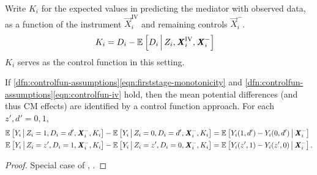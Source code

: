 Write $K_i$ for the expected values in predicting the mediator with observed data, as a function of the instrument $\vec X_i^{\text{IV}}$ and remaining controls $\vec X_i^-$.
\begin{align*}
    K_i &= D_i - \mathbb{E}_{} \left[ D_i \, \middle\vert \, Z_i, \boldsymbol{\mathit{X}}_i^{\text{IV}}, \boldsymbol{\mathit{X}}_i^- \right]
\end{align*}
$K_{i}$ serves as the control function in this setting.
\begin{theorem}
    \label{thm:controlfun}
    If \ref{dfn:controlfun-assumptions}\eqref{eqn:firststage-monotonicity} and \ref{dfn:controlfun-assumptions}\eqref{eqn:controlfun-iv} hold, then the mean potential differences
    (and thus CM effects)
    are identified by a control function approach.
    For each $z', d' = 0,1$,
    \begin{align*}
        \mathbb{E}_{} \left[ Y_i \, \middle\vert \, Z_i = 1, D_i = d', \boldsymbol{\mathit{X}}_i^-, K_{i} \right]
        - \mathbb{E}_{} \left[ Y_i \, \middle\vert \, Z_i = 0, D_i = d', \boldsymbol{\mathit{X}}_i^-, K_{i} \right] 
        &= \mathbb{E}_{} \left[ Y_i(1, d') - Y_i(0, d') \, \middle\vert \, \boldsymbol{\mathit{X}}_i^- \right] \\
        \mathbb{E}_{} \left[ Y_i \, \middle\vert \, Z_i = z', D_i = 1, \boldsymbol{\mathit{X}}_i^-, K_{i} \right]
        - \mathbb{E}_{} \left[ Y_i \, \middle\vert \, Z_i = z', D_i = 0, \boldsymbol{\mathit{X}}_i^-, K_{i} \right] 
        &= \mathbb{E}_{} \left[ Y_i(z', 1) - Y_i(z', 0) \, \middle\vert \, \boldsymbol{\mathit{X}}_i^- \right].
    \end{align*}
\end{theorem}
\begin{proof}
    Special case of \citet[Theorem~1]{florens2008identification}, \citet[Theorem~3]{imbens2009identification}.
\end{proof}

